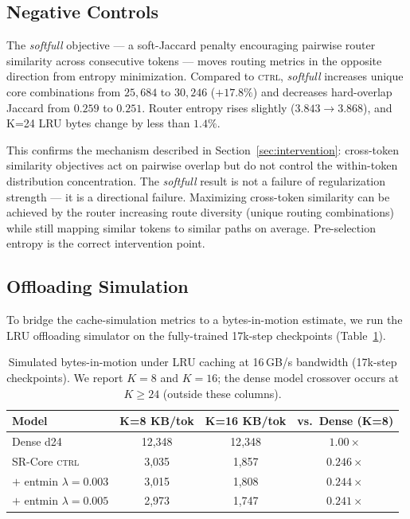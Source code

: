 \subsection{Negative Controls}
\label{sec:negcontrols}

The \emph{softfull} objective --- a soft-Jaccard penalty encouraging pairwise router
similarity across consecutive tokens --- moves routing metrics in the opposite direction
from entropy minimization.
Compared to \textsc{ctrl}, \emph{softfull} increases unique core combinations from
$25{,}684$ to $30{,}246$ ($+17.8\%$) and decreases hard-overlap Jaccard from $0.259$ to
$0.251$.
Router entropy rises slightly ($3.843 \to 3.868$), and K=24 LRU bytes change by less than
$1.4\%$.

This confirms the mechanism described in Section~\ref{sec:intervention}: cross-token
similarity objectives act on pairwise overlap but do not control the within-token
distribution concentration.
The \emph{softfull} result is not a failure of regularization strength --- it is a
directional failure.
Maximizing cross-token similarity can be achieved by the router increasing route diversity
(unique routing combinations) while still mapping similar tokens to similar paths on
average.
Pre-selection entropy is the correct intervention point.

\subsection{Offloading Simulation}
\label{sec:offload}

To bridge the cache-simulation metrics to a bytes-in-motion estimate, we run the LRU
offloading simulator on the fully-trained 17k-step checkpoints (Table~\ref{tab:offload}).

\begin{table}[t]
\centering
\caption{Simulated bytes-in-motion under LRU caching at 16\,GB/s bandwidth (17k-step
checkpoints). We report $K = 8$ and $K = 16$; the dense model crossover occurs at
$K \geq 24$ (outside these columns).}
\label{tab:offload}
\small
\begin{tabular}{lccc}
\toprule
Model & K=8 KB/tok & K=16 KB/tok & vs.\ Dense (K=8) \\
\midrule
Dense d24                    & 12{,}348 & 12{,}348 & $1.00\times$ \\
SR-Core \textsc{ctrl}        & 3{,}035  & 1{,}857  & $0.246\times$ \\
$+$ entmin $\lambda{=}0.003$ & 3{,}015  & 1{,}808  & $0.244\times$ \\
$+$ entmin $\lambda{=}0.005$ & 2{,}973  & 1{,}747  & $0.241\times$ \\
\bottomrule
\end{tabular}
\end{table}

